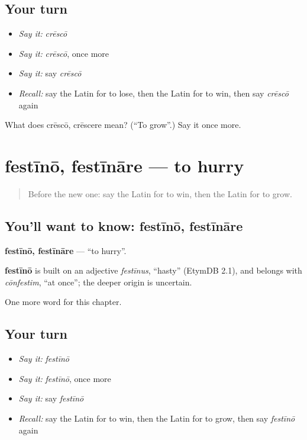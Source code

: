 \subsection*{Your turn}
\begin{itemize}
\raggedright
  \item \emph{Say it:} \emph{crēscō}
  \item \emph{Say it:} \emph{crēscō}, once more
  \item \emph{Say it:} say \emph{crēscō}
  \item \emph{Recall:} say the Latin for to lose, then the Latin for to win, then say \emph{crēscō} again
\end{itemize}

\begin{tcolorbox}[breakable,colback=teal!4,colframe=teal!35!black,title={Before you move on}]
What does crēscō, crēscere mean? (\textquotedblleft{}To grow\textquotedblright{}.) Say it once more.
\end{tcolorbox}
\section[festīnō, festīnāre]{festīnō, festīnāre — to hurry}

\label{lesson:LA-C158-festino}



\begin{quote}
Before the new one: say the Latin for to win, then the Latin for to grow.
\end{quote}

\subsection*{You'll want to know: festīnō, festīnāre}
\textbf{festīnō, festīnāre} — \textquotedblleft{}to hurry\textquotedblright{}.

\begin{cousinweb}
\textbf{festīnō} is built on an adjective \emph{festīnus}, \textquotedblleft{}hasty\textquotedblright{} (EtymDB 2.1), and belongs with \emph{cōnfestim}, \textquotedblleft{}at once\textquotedblright{}; the deeper origin is uncertain.
\end{cousinweb}

\begin{grammarlens}[title={What you've built}]
One more word for this chapter.
\end{grammarlens}

\subsection*{Your turn}
\begin{itemize}
\raggedright
  \item \emph{Say it:} \emph{festīnō}
  \item \emph{Say it:} \emph{festīnō}, once more
  \item \emph{Say it:} say \emph{festīnō}
  \item \emph{Recall:} say the Latin for to win, then the Latin for to grow, then say \emph{festīnō} again
\end{itemize}

